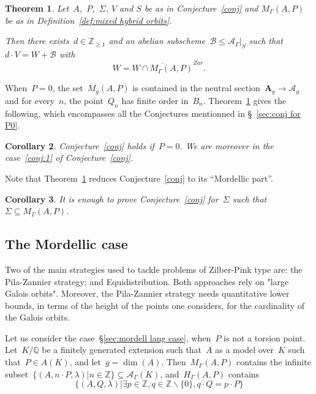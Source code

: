 \documentclass[12pt]{amsart}
\newtheorem{theorem}{Theorem}[section]
\newtheorem{corollary}[theorem]{Corollary}
\newcommand{\Z}{{\mathbb Z}}
\newcommand{\Q}{{\mathbb Q}}
\newcommand{\C}{{\mathbb C}}
\newcommand{\ol}{\overline}
\begin{document}
\begin{theorem}\label{thm:Main}
Let~$A$,~$P$,~$\Sigma$, $V$ and $S$ be as in Conjecture~\ref{conj} and $M_\Gamma(A,P)$ be as in Definition~\ref{def:mixed hybrid orbits}.
%

Then there exists~$d\in \Z_{\geq1}$ and an abelian subscheme~$\mathcal{B}\leq \mathcal{A}_{\Gamma}|_{S}$ such that~$d\cdot V=W+\mathcal{B}$ with
\[
W=\ol{W\cap M_\Gamma(A,P)}^{Zar}.
\]
\end{theorem}
When~$P=0$, the set~$M_g(A,P)$ is contained in the neutral section~$\mathbf{A}_g\to \mathcal{A}_g$ and for every~$n$, the point~$Q_n$ has finite order in~$B_n$. 
Theorem~\ref{thm:Main} gives the following, which encompasses all the Conjectures mentionned in \S~\ref{sec:conj for P0}.
\begin{corollary}\label{thm:MMonHyb} Conjecture~\ref{conj} holds if~$P=0$. We are moreover in the case~\eqref{conj:1} of Conjecture~\ref{conj}.
\end{corollary}
	
Note that Theorem~\ref{thm:Main} reduces Conjecture~\ref{conj} to its ``Mordellic part''.
\begin{corollary}It is enough to prove Conjecture~\ref{conj} for~$\Sigma$ such that~$\Sigma\subseteq M_\Gamma(A,P)$.
\end{corollary}
\subsection{The Mordellic case}
Two of the main strategies used to tackle problems of Zilber-Pink type are: the Pila-Zannier strategy; and Equidistribution.
Both approaches rely on "large Galois orbits".
Moreover, the Pila-Zannier strategy needs quantitative lower bounds, in terms of the height of the points one considers, for the cardinality of the Galois orbits.

Let us consider the case~\S\ref{sec:mordell lang case}, when~$P$ is not a torsion point. Let~$K/\Q$ be a finitely generated extension such that~$A$ as a model over~$K$ such that~$P\in A(K)$, and let~$g=\dim(A)$. Then~$M_\Gamma(A,P)$ contains the infinite subset~$\{(A,n\cdot P,\lambda)|n\in\Z\}\subseteq \mathcal{A}_\Gamma(K)$, and~$H_\Gamma(A,P)$ contains 
\[
\{(A,Q,\lambda)|\exists p\in \Z,q \in\Z\smallsetminus\{0\}, q\cdot Q=p\cdot P\}
\]
\end{document}
